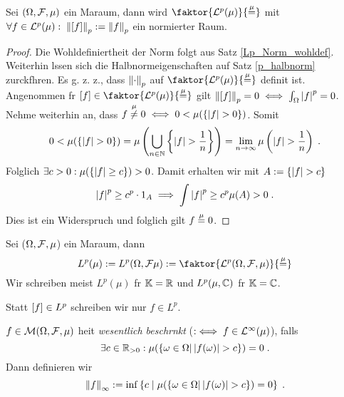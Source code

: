 \begin{theorem} Sei \((\Omega, \mathcal{F}, \mu)\) ein Ma\s raum, dann wird
	\(\faktor{\p^p(\mu)}{\muq}\) mit \(\forall f \in \mathcal{L}^p(\mu): \;\left\lVert\left[ f\right]\right\rVert_{p} := \left\lVert f\right\rVert_{p}\) ein normierter Raum.
\end{theorem}
\begin{proof}
	Die Wohldefiniertheit der Norm folgt aus Satz \ref{Lp_Norm_wohldef}. Weiterhin l\as ssen sich die Halbnormeigenschaften auf Satz \ref{p_halbnorm} zur\us ckf\us hren. Es g. z. z., dass \(\left\lVert\cdot\right\rVert_{p}\) auf \(\faktor{\p^p(\mu)}{\muq}\) definit ist. Angenommen f\us r \(\equ{f} \in \faktor{\p^p(\mu)}{\muq}\)  gilt \(\left\lVert\left[ f\right]\right\rVert_{p} = 0 \iff \int_\Omega \left\lvert f \right\rvert^p = 0\). Nehme weiterhin an, dass \(f \overset{\mu}{\neq} 0\iff 0< \mu(\left\{\left\lvert f \right\rvert>0\right\})\). Somit
	\[0<\mu(\left\{\left\lvert f \right\rvert>0\right\}) = \mu\left(\bigcup_{n\in\mathbb{N}}\left\{\left\lvert f \right\rvert > \frac{1}{n}\right\}\right) = \lim_{n \to\infty}\mu \left(\left\lvert f \right\rvert> \frac{1}{n}\right)\;.\]
	Folglich \(\exists c>0: \mu(\left\{\left\lvert f \right\rvert\geq c\right\}) > 0\). Damit erhalten wir mit \(A := \left\{\left\lvert f \right\rvert>c\right\}\)
	\[\left\lvert f \right\rvert^p \geq c^p \cdot 1_A \implies \int \left\lvert f \right\rvert^p \geq c^p \mu(A) > 0\;.\]
	Dies ist ein Widerspruch und folglich gilt \(f\overset{\mu}{=} 0\).
\end{proof}

\begin{definition}
	Sei (\(\Omega, \mathcal{F}, \mu\)) ein Ma\s raum, dann 
	\[L^p(\mu) := L^p(\Omega,\mc F \mu) := \faktor{\p^p(\Omega, \mc F,\mu)}{\muq}\]
	Wir schreiben meist \(L^p(\mu)\) f\us r \(\mathbb{K} = \mathbb{R}\) und \(L^p(\mu, \mathbb{C})\) f\us r \(\mathbb{K} = \mathbb{C}\).
\end{definition}
 \begin{rem}
 	Statt \(\left[ f\right] \in L^p\) schreiben wir nur \(f\in L^p\).
 \end{rem}
\begin{definition}
	\(f\in \mathcal{M}(\Omega, \mathcal{F}, \mu)\) hei\s t \textit{wesentlich beschr\as nkt} (\(:\iff f \in \mathcal{L}^\infty(\mu)\)), falls
	\[\exists c \in \mathbb{R}_{>0} : \mu(\left\{\omega \in\Omega\vert \left\lvert f(\omega) \right\rvert > c\right\}) = 0\;.\]
	Dann definieren wir
	\[\left\lVert f\right\rVert_\infty := \inf\left\{c\;\vert\;\mu(\left\{\omega \in\Omega\vert \left\lvert f(\omega) \right\rvert > c\right\}) = 0\right\}\;.\]
\end{definition}

